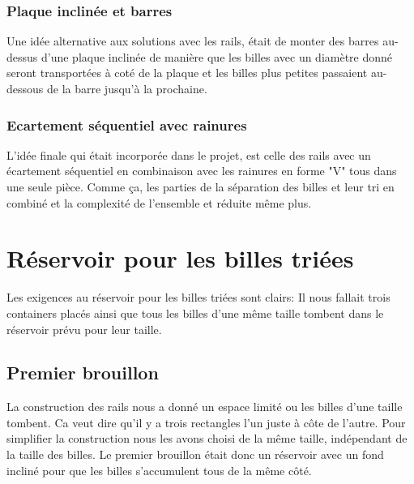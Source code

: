 
\subsubsection{Plaque inclinée et barres}
Une idée alternative aux solutions avec les rails, était de monter des barres au-dessus d'une plaque inclinée de manière que les billes avec un diamètre donné seront transportées à coté de la plaque et les billes plus petites passaient au-dessous de la barre jusqu'à la prochaine.


\subsubsection{Ecartement séquentiel avec rainures}
L'idée finale qui était incorporée dans le projet, est celle des rails avec un écartement séquentiel en combinaison avec les rainures en forme "V" tous dans une seule pièce. Comme ça, les parties de la séparation des billes et leur tri en combiné et la complexité de l'ensemble et réduite même plus.

\section{Réservoir pour les billes triées}
Les exigences au réservoir pour les billes triées sont clairs: Il nous fallait trois containers placés ainsi que tous les billes d'une même taille tombent dans le réservoir prévu pour leur taille.

\subsection{Premier brouillon}
La construction des rails nous a donné un espace limité ou les billes d'une taille tombent. Ca veut dire qu'il y a trois rectangles l'un juste à côte de l'autre. Pour simplifier la construction nous les avons choisi de la même taille, indépendant de la taille des billes. Le premier brouillon était donc un réservoir avec un fond incliné pour que les billes s'accumulent tous de la même côté.

